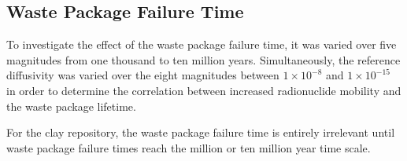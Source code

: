 
\subsection{Waste Package Failure Time}

To investigate the effect of the waste package failure time, it was varied over 
five magnitudes from one thousand to ten million years. Simultaneously, the reference 
diffusivity was varied over the eight magnitudes between $1\times10^{-8}$ and 
$1\times10^{-15}$ in order to determine the correlation between increased 
radionuclide mobility and the waste package lifetime. 


For the clay repository, the waste package failure time is entirely irrelevant 
until waste package failure times reach the million or ten million year time 
scale. 

